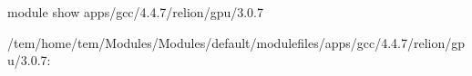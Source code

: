 \documentclass[letterpaper,10pt,english]{sphinxmanual}
\begin{document}
\begin{sphinxVerbatim}[commandchars=\\\{\}]
\PYGZdl{}\PYGZgt{} module show apps/gcc/4.4.7/relion/gpu/3.0.7

\PYGZhy{}\PYGZhy{}\PYGZhy{}\PYGZhy{}\PYGZhy{}\PYGZhy{}\PYGZhy{}\PYGZhy{}\PYGZhy{}\PYGZhy{}\PYGZhy{}\PYGZhy{}\PYGZhy{}\PYGZhy{}\PYGZhy{}\PYGZhy{}\PYGZhy{}\PYGZhy{}\PYGZhy{}\PYGZhy{}\PYGZhy{}\PYGZhy{}\PYGZhy{}\PYGZhy{}\PYGZhy{}\PYGZhy{}\PYGZhy{}\PYGZhy{}\PYGZhy{}\PYGZhy{}\PYGZhy{}\PYGZhy{}\PYGZhy{}\PYGZhy{}\PYGZhy{}\PYGZhy{}\PYGZhy{}\PYGZhy{}\PYGZhy{}\PYGZhy{}\PYGZhy{}\PYGZhy{}\PYGZhy{}\PYGZhy{}\PYGZhy{}\PYGZhy{}\PYGZhy{}\PYGZhy{}\PYGZhy{}\PYGZhy{}\PYGZhy{}\PYGZhy{}\PYGZhy{}\PYGZhy{}\PYGZhy{}\PYGZhy{}\PYGZhy{}\PYGZhy{}\PYGZhy{}\PYGZhy{}\PYGZhy{}\PYGZhy{}\PYGZhy{}\PYGZhy{}\PYGZhy{}\PYGZhy{}\PYGZhy{}
/tem/home/tem/Modules/Modules/default/modulefiles/apps/gcc/4.4.7/relion/gpu/3.0.7:


\end{sphinxVerbatim}
\end{document}
